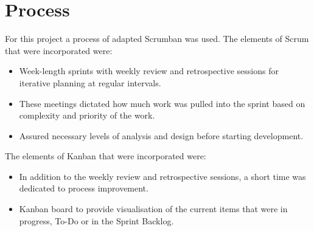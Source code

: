 



\section{Process}

For this project a process of adapted Scrumban was used. The elements of Scrum that were incorporated were: 
\begin{itemize}
	\item Week-length sprints with weekly review and retrospective sessions for iterative planning at regular intervals.
	\item These meetings dictated how much work was pulled into the sprint based on complexity and priority of the work.
	\item Assured necessary levels of analysis and design before starting development.
\end{itemize}
The elements of Kanban that were incorporated were:
\begin{itemize}
	\item In addition to the weekly review and retrospective sessions, a short time was dedicated to process improvement.
	\item Kanban board to provide visualisation of the current items that were in progress, To-Do or in the Sprint Backlog.
\end{itemize}
